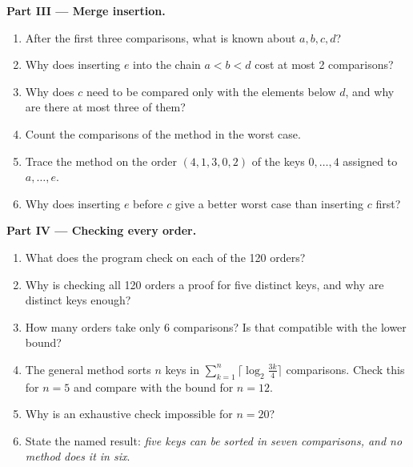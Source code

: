 \begin{problem}
\medskip\noindent\textbf{Part III --- Merge insertion.}
\begin{enumerate}[resume]
\item After the first three comparisons, what is known about $a, b, c, d$?
\item Why does inserting $e$ into the chain $a < b < d$ cost at most 2 comparisons?
\item Why does $c$ need to be compared only with the elements below $d$, and why are there at most three of them?
\item Count the comparisons of the method in the worst case.
\item Trace the method on the order $(4, 1, 3, 0, 2)$ of the keys $0, \dots, 4$ assigned to $a, \dots, e$.
\item Why does inserting $e$ before $c$ give a better worst case than inserting $c$ first?
\end{enumerate}

\medskip\noindent\textbf{Part IV --- Checking every order.}
\begin{enumerate}[resume]
\item What does the program check on each of the 120 orders?
\item Why is checking all 120 orders a proof for five distinct keys, and why are distinct keys enough?
\item How many orders take only 6 comparisons? Is that compatible with the lower bound?
\item The general method sorts $n$ keys in $\sum_{k=1}^{n} \lceil \log_2 \frac{3k}{4} \rceil$ comparisons. Check this
for $n = 5$ and compare with the bound for $n = 12$.
\item Why is an exhaustive check impossible for $n = 20$?
\item State the named result: \emph{five keys can be sorted in seven comparisons, and no method does it in six}.
\end{enumerate}
\end{problem}
